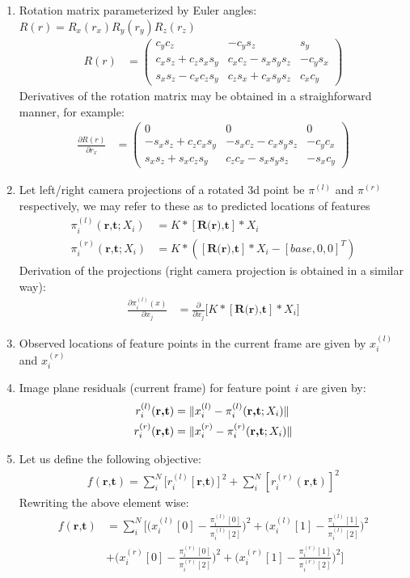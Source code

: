 \documentclass[10pt]{article}         %
\DeclarePairedDelimiter\norm{\lVert}{\rVert}%
\begin{document}
\begin{enumerate}
\item Rotation matrix parameterized by Euler angles: $R(r) = R_x(r_x)R_y(r_y)R_z(r_z)$
\begin{align*}
R(r) &= \begin{pmatrix}
c_yc_z& -c_ys_z& s_y\\
c_xs_z+c_zs_xs_y& c_xc_z-s_xs_ys_z& -c_ys_x\\
s_xs_z-c_xc_zs_y& c_zs_x+c_xs_ys_z& c_xc_y
\end{pmatrix}
\end{align*}
Derivatives of the rotation matrix may be obtained in a straighforward manner, for example:
\begin{align*}
\frac{\partial R(r)}{\partial r_x} &= \begin{pmatrix}
0& 0& 0\\
-s_xs_z+c_zc_xs_y& -s_xc_z-c_xs_ys_z& -c_yc_x\\
s_xs_z+s_xc_zs_y& c_zc_x-s_xs_ys_z& -s_xc_y
\end{pmatrix}
\end{align*}
\item Let left/right camera projections of a rotated 3d point be $\pi^{(l)}$ and $\pi^{(r)}$ respectively, we may refer to these as to predicted locations of features
\begin{align*}
\pi_i^{(l)}(\textbf{r,t};X_i) &= K*[\textbf{R(r),t}]*X_i\\
\pi_i^{(r)}(\textbf{r,t};X_i) &= K*([\textbf{R(r),t}]*X_i - [base,0,0]^T)
\end{align*}
Derivation of the projections (right camera projection is obtained in a similar way):
\begin{align*}
\frac{\partial \pi_i^{(l)}(x)}{\partial x_j} &= \frac{\partial }{\partial x_j}\Bigg[K*[\textbf{R(r),t}]*X_i\Bigg]
\end{align*}
\item Observed locations of feature points in the current frame are given by $x_i^{(l)}$ and $x_i^{(r)}$
\item Image plane residuals (current frame) for feature point $i$ are given by:
\begin{align*}
r_i^{(l)}(\textbf{r,t}) &= \norm{x_i^{(l)}-\pi_i^{(l)}(\textbf{r,t};X_i)}\\
r_i^{(r)}(\textbf{r,t}) &= \norm{x_i^{(r)}-\pi_i^{(r)}(\textbf{r,t};X_i)}
\end{align*}
\item Let us define the following objective:
\begin{align*}\label{eq:objective}
f(\textbf{r,t}) =\sum_i^N[r_i^{(l)}[\textbf{r,t})]^2+\sum_i^N[r_i^{(r)}(\textbf{r,t})]^2
\end{align*}
Rewriting the above element wise:
\begin{align*}
f(\textbf{r,t})&=\sum_i^N\Bigg[\Big(x_i^{(l)}[0]-\frac{\pi_i^{(l)}[0]}{\pi_i^{(l)}[2]}\Big)^2+\Big(x_i^{(l)}[1]-\frac{\pi_i^{(l)}[1]}{\pi_i^{(l)}[2]}\Big)^2\\
&+\Big(x_i^{(r)}[0]-\frac{\pi_i^{(r)}[0]}{\pi_i^{(r)}[2]}\Big)^2+\Big(x_i^{(r)}[1]-\frac{\pi_i^{(r)}[1]}{\pi_i^{(r)}[2]}\Big)^2\Bigg]\\
\end{align*}



\end{enumerate}
\end{document}
